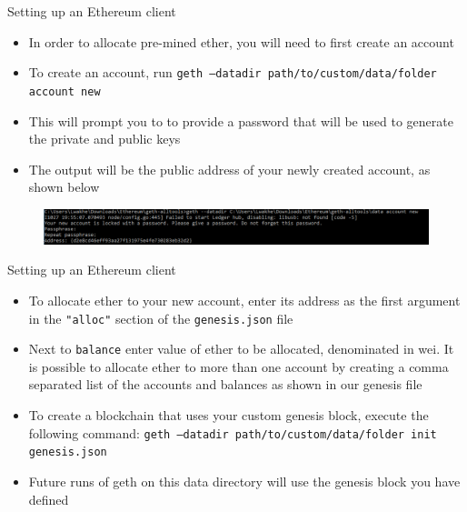 \documentclass[11pt]{beamer}
\begin{document}
\begin{frame}{Setting up an Ethereum client}
	\begin{itemize}
		\item In order to allocate pre-mined ether, you will need to first create an account
		\item To create an account, run \texttt{geth ---datadir path/to/custom/data/folder account new}
		\item This will prompt you to to provide a password that will be used to generate the private and public keys
		\item The output will be the public address of your newly created account, as shown below
	\end{itemize}
	\begin{figure}[]
		\centering
		\includegraphics  [scale=0.4]{Images/geth5}
	\end{figure}
\end{frame}


\begin{frame}{Setting up an Ethereum client}
	\begin{itemize}
		\item To allocate ether to your new account, enter its address as the first argument in the \texttt{"alloc"} section of the \texttt{genesis.json} file
		\item Next to \texttt{balance} enter value of ether to be allocated, denominated in wei. It is possible to allocate ether to more than one account by creating a comma separated list of the accounts and balances as shown in our genesis file
		\item To create a blockchain that uses your custom genesis block, execute the following command: \texttt{geth ---datadir path/to/custom/data/folder init genesis.json}
		\item Future runs of geth on this data directory will use the genesis block you have defined
	\end{itemize}
\end{frame}

\end{document}

